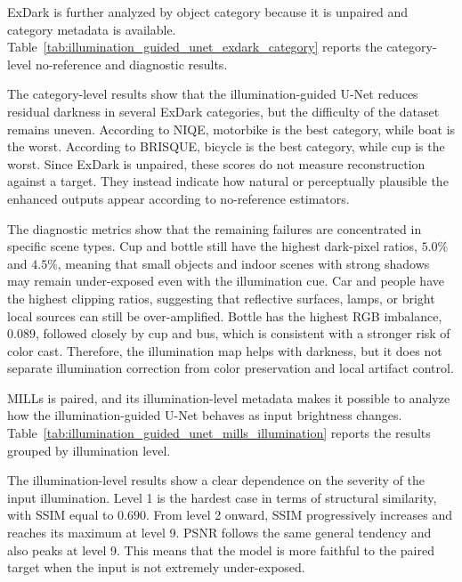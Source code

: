 ExDark is further analyzed by object category because it is unpaired and category metadata is available. Table~\ref{tab:illumination_guided_unet_exdark_category} reports the category-level no-reference and diagnostic results.



The category-level results show that the illumination-guided U-Net reduces residual darkness in several ExDark categories, but the difficulty of the dataset remains uneven. According to NIQE, motorbike is the best category, while boat is the worst. According to BRISQUE, bicycle is the best category, while cup is the worst. Since ExDark is unpaired, these scores do not measure reconstruction against a target. They instead indicate how natural or perceptually plausible the enhanced outputs appear according to no-reference estimators.

The diagnostic metrics show that the remaining failures are concentrated in specific scene types. Cup and bottle still have the highest dark-pixel ratios, $5.0\%$ and $4.5\%$, meaning that small objects and indoor scenes with strong shadows may remain under-exposed even with the illumination cue. Car and people have the highest clipping ratios, suggesting that reflective surfaces, lamps, or bright local sources can still be over-amplified. Bottle has the highest RGB imbalance, $0.089$, followed closely by cup and bus, which is consistent with a stronger risk of color cast. Therefore, the illumination map helps with darkness, but it does not separate illumination correction from color preservation and local artifact control.

MILLs is paired, and its illumination-level metadata makes it possible to analyze how the illumination-guided U-Net behaves as input brightness changes. Table~\ref{tab:illumination_guided_unet_mills_illumination} reports the results grouped by illumination level.



The illumination-level results show a clear dependence on the severity of the input illumination. Level 1 is the hardest case in terms of structural similarity, with SSIM equal to $0.690$. From level 2 onward, SSIM progressively increases and reaches its maximum at level 9. PSNR follows the same general tendency and also peaks at level 9. This means that the model is more faithful to the paired target when the input is not extremely under-exposed.

